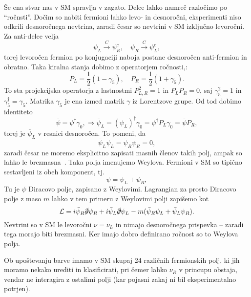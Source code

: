 Še ena stvar nas v SM spravlja v zagato. Delce lahko namreč razločimo po "`ročnsti"'. Dočim so
nabiti fermioni lahko levo- in desnoročni, eksperimenti niso odkrili desnoročnega nevtrina, zaradi
česar so nevtrini v SM izključno levoročni. Za anti-delce velja
\begin{equation}
	\psi_L \stackrel{C}{\longrightarrow} \psi^c_R, \quad \psi_R \stackrel{C}{\longrightarrow} \psi^c_L,
\end{equation}
torej levoročen fermion po konjugaciji naboja postane desnoročen anti-fermion in obratno. Taka kiralna stanja
dobimo z operatorjem ročnosti,:
\begin{equation}
	P_L = \frac{1}{2}(1 - \gamma_5), \quad P_R = \frac{1}{2}(1 + \gamma_5).
\end{equation}
To sta projekcijska operatorja z lastnostmi $P_{L,R}^2 = 1$ in $P_L P_R = 0$, saj $\gamma_5^2 = 1$ in
$\gamma_5^\dagger = \gamma_5$. Matrika $\gamma_5$ je ena izmed matrik $\gamma$ iz Lorentzove grupe. Od
tod dobimo identiteto
\begin{equation}
	\bar{\psi} = \psi^\dagger \gamma_0, \Rightarrow \bar{\psi}_L = (\psi_L)^\dagger \gamma_0 =
		\psi^\dagger P_L \gamma_0 = \bar{\psi} P_R,
\end{equation}
torej je $\bar{\psi}_L$ v resnici desnoročen. To pomeni, da
\begin{equation}
	\bar{\psi}_L\psi_L = \bar{\psi}_R\psi_R = 0,
\end{equation}
zaradi česar ne moremo eksplicitno zapisati masnih členov takih polj, ampak so lahko le brezmasna~\cite{quang}.
Taka polja imenujemo Weylova. Fermioni v SM so tipično sestavljeni iz obeh komponent, tj.
\begin{equation}
	\psi = \psi_L + \psi_R,
\end{equation}
Tu je $\psi$ Diracovo polje, zapisano z Weylovimi. Lagrangian za prosto Diracovo polje z maso $m$ lahko v tem
primeru z Weylovimi polji zapišemo kot
\begin{equation}
	\mathcal{L} = i\bar{\psi}_R\slashed{\partial}\psi_R + i\bar{\psi}_L\slashed{\partial}\psi_L -
		m(\bar{\psi}_R\psi_L + \bar{\psi}_L\psi_R).
	\label{weylovaMasa}
\end{equation}
Nevtrini so v SM le levoročni $\nu = \nu_L$ in nimajo desnoročnega prispevka -- zaradi tega morajo biti
brezmasni. Ker imajo dobro definirano ročnost so to Weylova polja.

Ob upoštevanju barve imamo v SM skupaj 24 različnih fermionskih polj, ki jih moramo nekako urediti
in klasificirati, pri čemer lahko $\nu_R$ v princupu obstaja, vendar ne interagira z ostalimi polji
(kar pojasni zakaj ni bil eksperimentalno potrjen).

